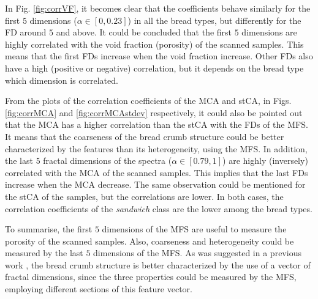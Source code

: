 In Fig. \ref{fig:corrVF}, it becomes clear that the coefficients behave similarly for the first $5$ dimensions ($\alpha \in [0,0.23]$) in all the bread types, but differently for the FD around $5$ and above. It could be concluded that the first $5$ dimensions are highly correlated with the void fraction (porosity) of the scanned samples. This means that the first FDs increase when the void fraction increase. Other FDs also have a high (positive or negative) correlation, but it depends on the bread type which dimension is correlated.

From the plots of the correlation coefficients of the MCA and stCA, in Figs. \ref{fig:corrMCA} and \ref{fig:corrMCAstdev} respectively, it could also be pointed out that the MCA has a higher correlation than the stCA with the FDs of the MFS. It means that the coarseness of the bread crumb structure could be better characterized by the features than its heterogeneity, using the MFS. In addition, the last $5$ fractal dimensions of the spectra ($\alpha \in [0.79,1]$) are highly (inversely) correlated with the MCA of the scanned samples. This implies that the last FDs increase when the MCA decrease. The same observation could be mentioned for the stCA of the samples, but the correlations are lower. In both cases, the correlation coefficients of the {\em sandwich} class are the lower among the bread types.

To summarise, the first $5$ dimensions of the MFS are useful to measure the porosity of the scanned samples. Also, coarseness and heterogeneity could be measured by the last $5$ dimensions of the MFS. As was suggested in a previous work \cite{Gonzales2008}, the bread crumb structure is better characterized by the use of a vector of fractal dimensions, since the three properties could be measured by the MFS, employing different sections of this feature vector.



